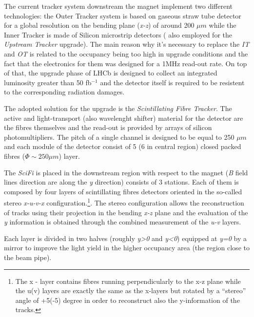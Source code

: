 \documentclass[paper=a4, fontsize=10pt]{scrartcl}
\numberwithin{equation}{section}		%
\numberwithin{figure}{section}			%
\numberwithin{table}{section}				%
\begin{document}
The current tracker system downstream the magnet implement two different technologies: the Outer Tracker system is based on gaseous straw tube detector for a global resolution on the bending plane (\textit{x-z}) of around 200 $\mu m$ while the Inner Tracker is made of Silicon microstrip detectors ( also employed for the \textit{Upstream Tracker} upgrade).
The main reason why it's necessary to replace the \textit{IT} and \textit{OT} is related to the occupancy being too high in upgrade conditions and the fact that the electronics for them was designed for a 1MHz read-out rate. On top of that, the upgrade phase of LHCb is designed to collect an integrated luminosity greater than 50 fb$^{-1}$ and the detector itself is required to be resistent to the corresponding radiation damages.

The adopted solution for the upgrade is the \textit{Scintillating Fibre Tracker}. The active and light-transport (also wavelenght shifter) material for the detector are the fibres themselves and the read-out is provided by arrays of silicon photomultipliers. The pitch of a single channel is designed to be equal to 250 $\mu m$ and each module of the detector consist of 5 (6 in central region) closed packed fibres ($\Phi \sim 250 \mu m$) layer.

 
The \textit{SciFi} is placed in the downstream region with respect to the magnet (\textit{B} field lines direction are along the \textit{y} direction) consists of 3 stations. Each of them is composed by four layers of scintillating fibres detectors oriented in the so-called stereo \textit{x-u-v-x} configuration.\footnote{The x - layer contains fibres running perpendicularly to the x-z plane while the u(v) layers are exactly the same as the x-layers but rotated by a ``stereo'' angle of +5(-5) degree in order to reconstruct also the y-information of the tracks.}. The stereo configuration allows the reconstruction of tracks using their projection in the bending \textit{x-z} plane and the evaluation of the \textit{y} information is obtained through the combined measurement of the \textit{u-v} layers. 

Each layer is divided in two halves (roughly \textit{y>0} and \textit{y<0}) equipped at \textit{y=0} by a mirror to improve the light yield in the higher occupancy area (the region close to the beam pipe).
\end{document}
